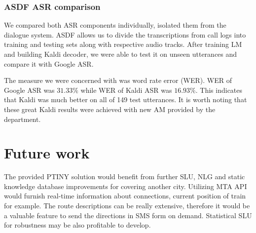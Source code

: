\subsubsection{ASDF ASR comparison}

We compared both ASR components individually, isolated them from the dialogue system.
ASDF allows us to divide the transcriptions from call logs into training and testing sets along with respective audio tracks.
After training LM and building Kaldi decoder, we were able to test it on unseen utterances and compare it with Google ASR.

The measure we were concerned with was word rate error (WER).
WER of Google ASR was $31.33\%$ while WER of Kaldi ASR was $16.93\%$.
This indicates that Kaldi was much better on all of 149 test utterances.
It is worth noting that these great Kaldi results were achieved with new AM provided by the department.

\section{Future work}

The provided PTINY solution would benefit from further SLU, NLG and static knowledge database improvements for covering another city.
Utilizing MTA API would furnish real-time information about connections, current position of train for example.
The route descriptions can be really extensive, therefore it would be a valuable feature to send the directions in SMS form on demand.
Statistical SLU for robustness may be also profitable to develop.
